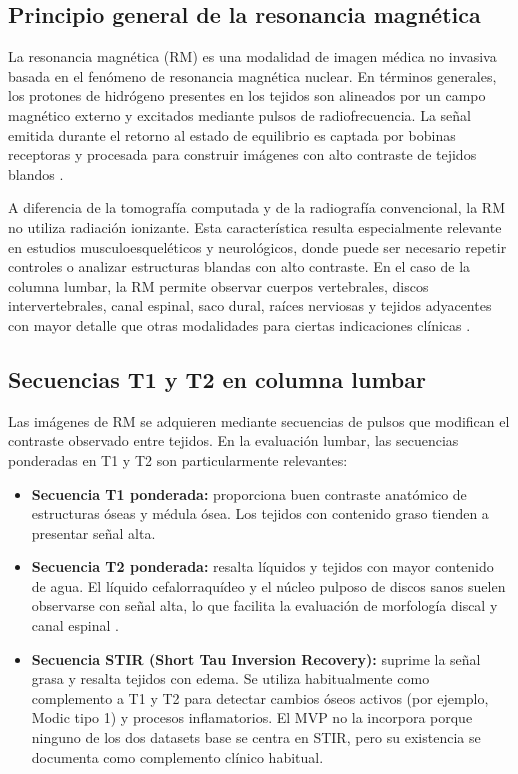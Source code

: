 \subsection{Principio general de la resonancia magnética}

La resonancia magnética (RM) es una modalidad de imagen médica no invasiva basada en el fenómeno de resonancia magnética nuclear. En términos generales, los protones de hidrógeno presentes en los tejidos son alineados por un campo magnético externo y excitados mediante pulsos de radiofrecuencia. La señal emitida durante el retorno al estado de equilibrio es captada por bobinas receptoras y procesada para construir imágenes con alto contraste de tejidos blandos \parencite{brown_semelka_mri_2014,mcrobbie_mri_2017}.

A diferencia de la tomografía computada y de la radiografía convencional, la RM no utiliza radiación ionizante. Esta característica resulta especialmente relevante en estudios musculoesqueléticos y neurológicos, donde puede ser necesario repetir controles o analizar estructuras blandas con alto contraste. En el caso de la columna lumbar, la RM permite observar cuerpos vertebrales, discos intervertebrales, canal espinal, saco dural, raíces nerviosas y tejidos adyacentes con mayor detalle que otras modalidades para ciertas indicaciones clínicas \parencite{modic_disk_1988,jarvik_deyo_low_back_pain_2002}.

\subsection{Secuencias T1 y T2 en columna lumbar}

Las imágenes de RM se adquieren mediante secuencias de pulsos que modifican el contraste observado entre tejidos. En la evaluación lumbar, las secuencias ponderadas en T1 y T2 son particularmente relevantes:

\begin{itemize}
    \item \textbf{Secuencia T1 ponderada:} proporciona buen contraste anatómico de estructuras óseas y médula ósea. Los tejidos con contenido graso tienden a presentar señal alta.
    \item \textbf{Secuencia T2 ponderada:} resalta líquidos y tejidos con mayor contenido de agua. El líquido cefalorraquídeo y el núcleo pulposo de discos sanos suelen observarse con señal alta, lo que facilita la evaluación de morfología discal y canal espinal \parencite{modic_disk_1988}.
    \item \textbf{Secuencia STIR (Short Tau Inversion Recovery):} suprime la señal grasa y resalta tejidos con edema. Se utiliza habitualmente como complemento a T1 y T2 para detectar cambios óseos activos (por ejemplo, Modic tipo 1) y procesos inflamatorios. El MVP no la incorpora porque ninguno de los dos datasets base se centra en STIR, pero su existencia se documenta como complemento clínico habitual.
\end{itemize}

